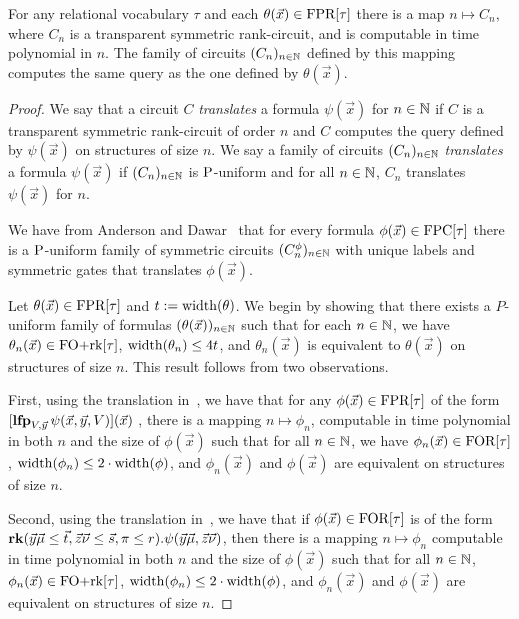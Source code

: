 \documentclass[../paper.tex]{subfiles}
\begin{document}
\begin{thm}
  For any relational vocabulary $\tau$ and each $\theta(\vec{x}) \in \text{\upshape FPR}[\tau]$
  there is a map $n \mapsto C_n$, where $C_n$ is a transparent symmetric
  rank-circuit, and is computable in time polynomial in $n$. The family of
  circuits $(C_n)_{n \in \mathbb{N}}$ defined by this mapping computes the same query
  as the one defined by $\theta(\vec{x})$.
  \label{thm:translating-formulas-to-circuits}
\end{thm}

\begin{proof}
  We say that a circuit $C$ \emph{translates} a formula $\psi(\vec{x})$ for $n
  \in \mathbb{N}$ if $C$ is a transparent symmetric rank-circuit of order $n$ and $C$
  computes the query defined by $\psi(\vec{x})$ on structures of size $n$. We
  say a family of circuits $(C_n)_{n \in \mathbb{N}}$ \emph{translates} a formula
  $\psi (\vec{x})$ if $(C_n)_{n \in \mathbb{N}}$ is $\mathrm{P}$-uniform and for all $n \in
  \mathbb{N}$, $C_n$ translates $\psi(\vec{x})$ for $n$.

  We have from Anderson and Dawar~\cite{AndersonD17} that for every formula
  $\phi(\vec{x}) \in \text{\upshape FPC}[\tau]$ there is a $\mathrm{P}$-uniform family of symmetric
  circuits $(C^{\phi}_n)_{n \in \mathbb{N}}$ with unique labels and symmetric gates
  that translates $\phi(\vec{x})$.
  
  Let $\theta(\vec{x}) \in \text{\upshape FPR}[\tau]$ and $t := \mathrm{width} (\theta)$. We begin by
  showing that there exists a $P$-uniform family of formulas
  $(\theta(\vec{x}))_{n \in \mathbb{N}}$ such that for each $n \in \mathbb{N}$, we have
  $\theta_n(\vec{x}) \in \text{\upshape FO+rk}[\tau]$, $\mathrm{width}(\theta_n) \leq 4 t$, and
  $\theta_n(\vec{x})$ is equivalent to $\theta(\vec{x})$ on structures of size
  $n$. This result follows from two observations.

  First, using the translation in~\cite{Dawar09logicswith}, we have that for any
  $\phi(\vec{x}) \in \text{\upshape FPR}[\tau]$ of the form $[\text{\textbf{lfp}}_{V, \vec{y}} \, \psi(\vec{x},
    \vec{y}, V) ](\vec{x})$ , there is a mapping $n \mapsto \phi_n$, computable
  in time polynomial in both $n$ and the size of $\phi(\vec{x})$ such that for
  all $n \in \mathbb{N}$, we have $\phi_n(\vec{x}) \in \text{\upshape FOR}[\tau]$, $\mathrm{width} (\phi_n)
  \leq 2 \cdot \mathrm{width} (\phi)$, and $\phi_n(\vec{x})$ and $\phi(\vec{x})$ are
  equivalent on structures of size $n$.

  Second, using the translation in~\cite{libkin2004elements}, we have that if
  $\phi (\vec{x}) \in \text{\upshape FOR}[\tau]$ is of the form $\text{\textbf{rk}} (\vec{y}\vec{\mu} \leq
  \vec{t}, \vec{z}\vec{\nu} \leq \vec{s}, \pi \leq r) . \psi (\vec{y}\vec{\mu},
  \vec{z} \vec{\nu})$, then there is a mapping $n \mapsto \phi_n$ computable in
  time polynomial in both $n$ and the size of $\phi(\vec{x})$ such that for all
  $n \in \mathbb{N}$, $\phi_n(\vec{x}) \in \text{\upshape FO+rk}[\tau]$, $\mathrm{width}(\phi_n) \leq 2 \cdot
  \mathrm{width}(\phi)$, and $\phi_n(\vec{x})$ and $\phi(\vec{x})$ are equivalent on
  structures of size $n$.


\end{proof}
\end{document}
